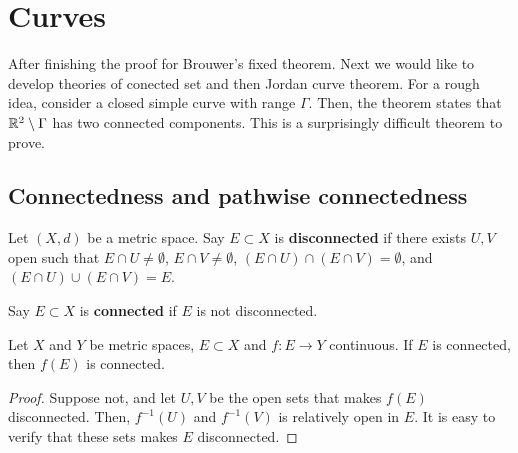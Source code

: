\documentclass[a4paper]{article}
\begin{document}
\section{Curves}

After finishing the proof for Brouwer's fixed theorem. Next we would like
to develop theories of conected set and then Jordan curve theorem. For a
rough idea, consider a closed simple curve with range $\Gamma$. Then, the
theorem states that $\mathbb{R}^2 \setminus \Gamma$ has two connected components.
This is a surprisingly difficult theorem to prove.

\subsection{Connectedness and pathwise connectedness}

\begin{defi}

  Let $(X, d)$ be a metric space. Say $E \subset X$ is
  \textbf{disconnected} if there exists $U, V$ open such that $E \cap U
  \neq \emptyset$, $E \cap V \neq \emptyset$, $(E \cap U) \cap (E \cap V)
  = \emptyset$, and $(E \cap U) \cup (E \cap V) = E$.

  Say $E \subset X$ is \textbf{connected} if $E$ is not disconnected.
\end{defi}

\begin{prop}

  Let $X$ and $Y$ be metric spaces, $E \subset X$ and $f : E \to Y$
  continuous. If $E$ is connected, then $f(E)$ is connected.
\end{prop}

\begin{proof}

  Suppose not, and let $U, V$ be the open sets that makes $f(E)$
  disconnected. Then, $f^{-1}(U)$ and $f^{-1} (V)$ is relatively open in
  $E$. It is easy to verify that these sets makes $E$ disconnected.
\end{proof}
\end{document}
